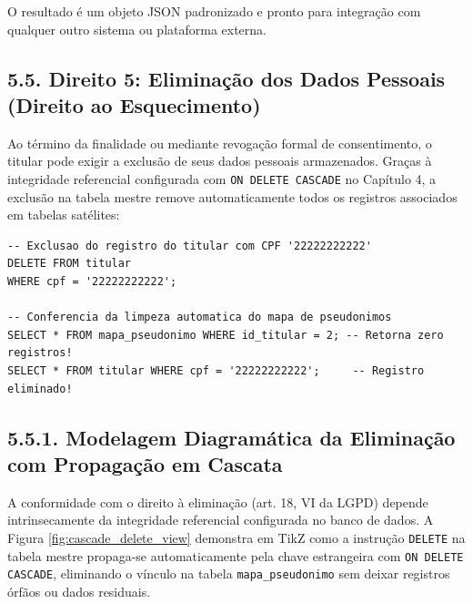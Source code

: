 O resultado é um objeto JSON padronizado e pronto para integração com qualquer outro sistema ou plataforma externa.

\subsection*{5.5. Direito 5: Eliminação dos Dados Pessoais (Direito ao Esquecimento)}

Ao término da finalidade ou mediante revogação formal de consentimento, o titular pode exigir a exclusão de seus dados pessoais armazenados. Graças à integridade referencial configurada com \texttt{ON DELETE CASCADE} no Capítulo 4, a exclusão na tabela mestre remove automaticamente todos os registros associados em tabelas satélites:

\begin{lstlisting}
-- Exclusao do registro do titular com CPF '22222222222'
DELETE FROM titular
WHERE cpf = '22222222222';

-- Conferencia da limpeza automatica do mapa de pseudonimos
SELECT * FROM mapa_pseudonimo WHERE id_titular = 2; -- Retorna zero registros!
SELECT * FROM titular WHERE cpf = '22222222222';     -- Registro eliminado!
\end{lstlisting}

\subsection*{5.5.1. Modelagem Diagramática da Eliminação com Propagação em Cascata}

A conformidade com o direito à eliminação (art. 18, VI da LGPD) depende intrinsecamente da integridade referencial configurada no banco de dados. A Figura \ref{fig:cascade_delete_view} demonstra em TikZ como a instrução \texttt{DELETE} na tabela mestre propaga-se automaticamente pela chave estrangeira com \texttt{ON DELETE CASCADE}, eliminando o vínculo na tabela \texttt{mapa\_pseudonimo} sem deixar registros órfãos ou dados residuais.

